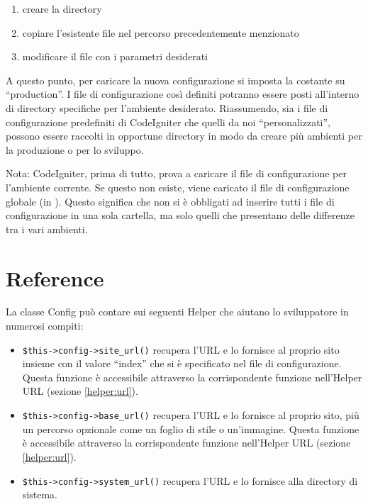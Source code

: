 \begin{enumerate}
\item creare la directory 
\item copiare l'esistente file  nel percorso precedentemente menzionato
\item modificare il file  con i parametri desiderati
\end{enumerate}

A questo punto, per caricare la nuova configurazione si imposta la costante  su ``production''. I file di configurazione così definiti potranno essere posti all'interno di directory specifiche per l'ambiente desiderato. Riassumendo, sia i file di configurazione predefiniti di CodeIgniter che quelli da noi ``personalizzati'', possono essere raccolti in opportune directory in modo da creare più ambienti per la produzione o per lo sviluppo.

Nota: CodeIgniter, prima di tutto, prova a caricare il file di configurazione per l'ambiente corrente. Se questo non esiste, viene caricato il file di configurazione globale (in ). Questo significa che non si è obbligati ad inserire tutti i file di configurazione in una sola cartella, ma solo quelli che presentano delle differenze tra i vari ambienti.

\section*{Reference}
La classe Config può contare sui seguenti Helper che aiutano lo sviluppatore in numerosi compiti:

\begin{itemize}
\item \verb|$this->config->site_url()| recupera l'\ac{URL} e lo fornisce al proprio sito insieme con il valore ``index'' che si è specificato nel file di configurazione. Questa funzione è accessibile attraverso la corrispondente funzione nell'Helper URL (sezione \vref{helper:url}).

\item \verb|$this->config->base_url()| recupera l'\ac{URL} e lo fornisce al proprio sito, più un percorso opzionale come un foglio di stile o un'immagine. Questa funzione è accessibile attraverso la corrispondente funzione nell'Helper URL (sezione \vref{helper:url}).

\item \verb|$this->config->system_url()| recupera l'\ac{URL} e lo fornisce alla directory di sistema.
\end{itemize}